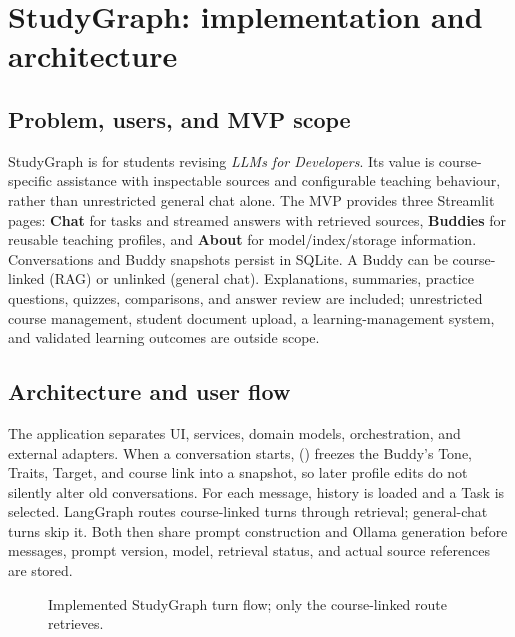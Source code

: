 \section{StudyGraph: implementation and architecture}
\subsection{Problem, users, and MVP scope}
StudyGraph is for students revising \emph{LLMs for Developers}.
Its value is course-specific assistance with inspectable sources and configurable
teaching behaviour, rather than unrestricted general chat alone. The MVP provides
three Streamlit pages: \textbf{Chat} for tasks and streamed answers with retrieved
sources, \textbf{Buddies} for reusable teaching profiles, and \textbf{About} for
model/index/storage information. Conversations and Buddy snapshots persist in SQLite.
A Buddy can be course-linked (RAG) or unlinked (general chat). Explanations,
summaries, practice questions, quizzes, comparisons, and answer review are
included; unrestricted course management, student document upload, a
learning-management system, and validated learning outcomes are outside scope.

\subsection{Architecture and user flow}
The application separates UI, services, domain models, orchestration, and external adapters.
When a conversation starts,  () freezes the Buddy's Tone,
Traits, Target, and course link into a snapshot, so later profile edits do not
silently alter old conversations. For each message, history is loaded and a Task is selected.
LangGraph routes course-linked turns through retrieval; general-chat turns skip it.
Both then share prompt construction and Ollama generation before messages,
prompt version, model, retrieval status, and actual source references are stored.

\begin{figure}[htbp]
\centering
\small
{}
\caption{Implemented StudyGraph turn flow; only the course-linked route retrieves.}
\label{fig:architecture}
\end{figure}

